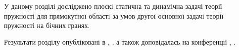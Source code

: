 У даному розділі досліджено плоскі статична та динамічна задачі теорії пружності для прямокутної області
за умов другої основної задачі теорії пружності на бічних гранях.



Результати розділу опубліковані в \cite{pozhylenkov_4}, \cite{pozhylenkov_6}, а також доповідалась на конференції \cite{conf_3}, \cite{conf_5}.